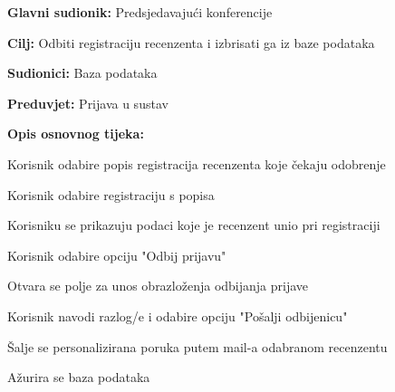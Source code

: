 					\noindent {}
					\begin{packed_item}
	
						\item \textbf{Glavni sudionik: } Predsjedavajući konferencije
						\item  \textbf{Cilj:} Odbiti registraciju recenzenta i izbrisati ga iz baze podataka
						\item  \textbf{Sudionici:} Baza podataka
						\item  \textbf{Preduvjet:} Prijava u sustav
						\item  \textbf{Opis osnovnog tijeka:}
						
						\item[] \begin{packed_enum}
	
							\item Korisnik odabire popis registracija recenzenta koje čekaju odobrenje
							\item Korisnik odabire registraciju s popisa
							\item Korisniku se prikazuju podaci koje je recenzent unio pri registraciji
							\item Korisnik odabire opciju "Odbij prijavu"
							\item Otvara se polje za unos obrazloženja odbijanja prijave
							\item Korisnik navodi razlog/e i odabire opciju "Pošalji odbijenicu"
							\item Šalje se personalizirana poruka putem mail-a odabranom recenzentu
							\item Ažurira se baza podataka

					
						\end{packed_enum}
			
					\end{packed_item}

					\noindent {\textbf{    }}
					\noindent {\textbf{    }}
					\noindent {\textbf{    }}
					\noindent {\textbf{    }}

